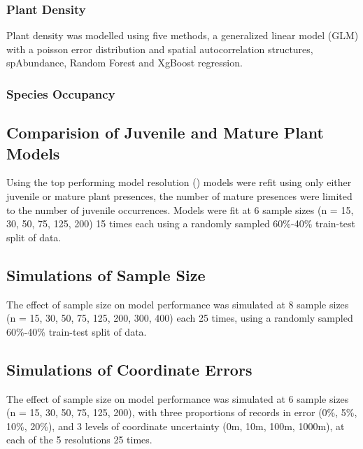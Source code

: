 \documentclass[
]{article}
\begin{document}
\hypertarget{plant-density}{%
\subsubsection{Plant Density}\label{plant-density}}

Plant density was modelled using five methods, a generalized linear
model (GLM) with a poisson error distribution and spatial
autocorrelation structures, spAbundance, Random Forest and XgBoost
regression.

\hypertarget{species-occupancy}{%
\subsubsection{Species Occupancy}\label{species-occupancy}}

\hypertarget{comparision-of-juvenile-and-mature-plant-models}{%
\subsection{Comparision of Juvenile and Mature Plant
Models}\label{comparision-of-juvenile-and-mature-plant-models}}

Using the top performing model resolution () models were refit using
only either juvenile or mature plant presences, the number of mature
presences were limited to the number of juvenile occurrences. Models
were fit at 6 sample sizes (n = 15, 30, 50, 75, 125, 200) 15 times each
using a randomly sampled 60\%-40\% train-test split of data.

\hypertarget{simulations-of-sample-size}{%
\subsection{Simulations of Sample
Size}\label{simulations-of-sample-size}}

The effect of sample size on model performance was simulated at 8 sample
sizes (n = 15, 30, 50, 75, 125, 200, 300, 400) each 25 times, using a
randomly sampled 60\%-40\% train-test split of data.

\hypertarget{simulations-of-coordinate-errors}{%
\subsection{Simulations of Coordinate
Errors}\label{simulations-of-coordinate-errors}}

The effect of sample size on model performance was simulated at 6 sample
sizes (n = 15, 30, 50, 75, 125, 200), with three proportions of records
in error (0\%, 5\%, 10\%, 20\%), and 3 levels of coordinate uncertainty
(0m, 10m, 100m, 1000m), at each of the 5 resolutions 25 times.
\end{document}
